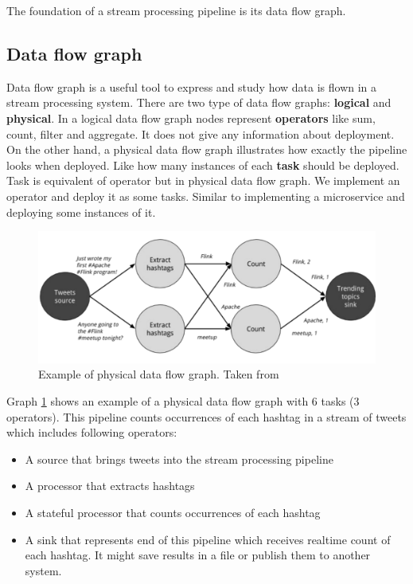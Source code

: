 \documentclass[a4]{report}
\begin{document}
    The foundation of a stream processing pipeline is its data flow graph.

    \subsection{Data flow graph}
    Data flow graph is a useful tool to express and study how data is flown in a stream processing system.
    There are two type of data flow graphs: \textbf{logical} and \textbf{physical}.
    In a logical data flow graph nodes represent \textbf{operators} like sum, count, filter and aggregate.
    It does not give any information about deployment.
    On the other hand, a physical data flow graph illustrates how exactly the pipeline looks when deployed.
    Like how many instances of each \textbf{task} should be deployed.
    Task is equivalent of operator but in physical data flow graph.
    We implement an operator and deploy it as some tasks.
    Similar to implementing a microservice and deploying some instances of it.

    \begin{figure}[ht]
        \caption{Example of physical data flow graph. Taken from \cite{flink}}
        \label{physical-data-flow-graph-example}
        \includegraphics[width=\linewidth, scale=0.6]{images/physical-data-flow-graph.png}
    \end{figure}

    Graph \ref{physical-data-flow-graph-example} shows an example of a physical data flow graph with 6 tasks (3
    operators).
    This pipeline counts occurrences of each hashtag in a stream of tweets which includes following operators:

    \begin{itemize}
        \item A source that brings tweets into the stream processing pipeline
        \item A processor that extracts hashtags
        \item A stateful processor that counts occurrences of each hashtag
        \item A sink that represents end of this pipeline which receives realtime count of each hashtag. It might
        save results in a file or publish them to another system.
    \end{itemize}
\end{document}
